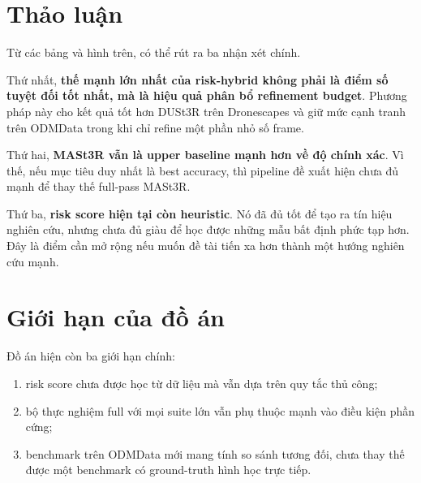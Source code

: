 \documentclass[../DoAn.tex]{subfiles}
\begin{document}
\section{Thảo luận}

Từ các bảng và hình trên, có thể rút ra ba nhận xét chính.

Thứ nhất, \textbf{thế mạnh lớn nhất của risk-hybrid không phải là điểm số tuyệt đối tốt nhất, mà là hiệu quả phân bổ refinement budget}. Phương pháp này cho kết quả tốt hơn DUSt3R trên Dronescapes và giữ mức cạnh tranh trên ODMData trong khi chỉ refine một phần nhỏ số frame.

Thứ hai, \textbf{MASt3R vẫn là upper baseline mạnh hơn về độ chính xác}. Vì thế, nếu mục tiêu duy nhất là best accuracy, thì pipeline đề xuất hiện chưa đủ mạnh để thay thế full-pass MASt3R.

Thứ ba, \textbf{risk score hiện tại còn heuristic}. Nó đã đủ tốt để tạo ra tín hiệu nghiên cứu, nhưng chưa đủ giàu để học được những mẫu bất định phức tạp hơn. Đây là điểm cần mở rộng nếu muốn đề tài tiến xa hơn thành một hướng nghiên cứu mạnh.

\section{Giới hạn của đồ án}

Đồ án hiện còn ba giới hạn chính:
\begin{enumerate}[leftmargin=1.5em]
  \item risk score chưa được học từ dữ liệu mà vẫn dựa trên quy tắc thủ công;
  \item bộ thực nghiệm full với mọi suite lớn vẫn phụ thuộc mạnh vào điều kiện phần cứng;
  \item benchmark trên ODMData mới mang tính so sánh tương đối, chưa thay thế được một benchmark có ground-truth hình học trực tiếp.
\end{enumerate}
\end{document}
